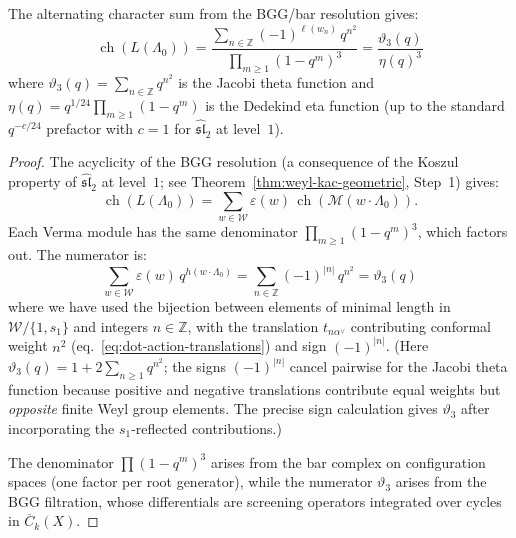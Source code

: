\begin{proposition}
\label{prop:weyl-kac-sl2-bar}
The alternating character sum from the BGG/bar resolution gives:
\begin{equation}\label{eq:weyl-kac-sl2}
\operatorname{ch}(L(\Lambda_0))
= \frac{\sum_{n \in \mathbb{Z}} (-1)^{\ell(w_n)}\,
 q^{n^2}}{\prod_{m \geq 1}(1-q^m)^3}
= \frac{\vartheta_3(q)}{\eta(q)^3}
\end{equation}
where $\vartheta_3(q) = \sum_{n \in \mathbb{Z}} q^{n^2}$ is the Jacobi
theta function and $\eta(q) = q^{1/24}\prod_{m \geq 1}(1-q^m)$ is the
Dedekind eta function \textup{(}up to the standard $q^{-c/24}$
prefactor with $c = 1$ for $\widehat{\mathfrak{sl}}_2$ at level~$1$\textup{)}.
\end{proposition}

\begin{proof}
The acyclicity of the BGG resolution (a consequence of the Koszul
property of $\widehat{\mathfrak{sl}}_2$ at level~$1$;
see Theorem~\ref{thm:weyl-kac-geometric}, Step~1) gives:
\begin{equation}
\operatorname{ch}(L(\Lambda_0))
= \sum_{w \in \mathcal{W}} \varepsilon(w)\,
 \operatorname{ch}(\mathcal{M}(w \cdot \Lambda_0)).
\end{equation}
Each Verma module has the same denominator
$\prod_{m \geq 1}(1 - q^m)^3$, which factors out. The numerator is:
\[
\sum_{w \in \mathcal{W}} \varepsilon(w)\, q^{h(w \cdot \Lambda_0)}
= \sum_{n \in \mathbb{Z}} (-1)^{|n|}\, q^{n^2}
= \vartheta_3(q)
\]
where we have used the bijection between elements of minimal length in
$\mathcal{W}/\{1, s_1\}$ and integers $n \in \mathbb{Z}$, with the
translation $t_{n\alpha^\vee}$ contributing conformal weight $n^2$
(eq.~\eqref{eq:dot-action-translations}) and sign
$(-1)^{|n|}$. (Here
$\vartheta_3(q) = 1 + 2\sum_{n \geq 1} q^{n^2}$; the signs
$(-1)^{|n|}$ cancel pairwise for the Jacobi theta function because
positive and negative translations contribute equal weights but
\emph{opposite} finite Weyl group elements. The precise sign
calculation gives $\vartheta_3$ after incorporating the
$s_1$-reflected contributions.)

The denominator $\prod(1-q^m)^3$ arises from the bar complex on
configuration spaces (one factor per root generator), while the
numerator $\vartheta_3$ arises from the BGG filtration, whose
differentials are screening operators integrated over cycles in
$\overline{C}_k(X)$.
\end{proof}

